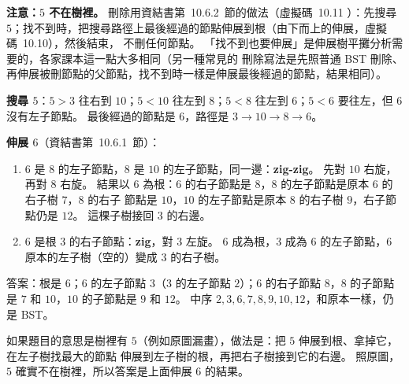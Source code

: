 \begin{pastsoln}
\textbf{注意：$5$ 不在樹裡。} 刪除用資結書第~10.6.2~節的做法（虛擬碼~10.11 ）：先搜尋
$5$；找不到時，把搜尋路徑上最後經過的節點伸展到根（由下而上的伸展，虛擬碼~10.10），然後結束，
不刪任何節點。 「找不到也要伸展」是伸展樹平攤分析需要的，各家課本這一點大多相同（另一種常見的
刪除寫法是先照普通 BST 刪除、再伸展被刪節點的父節點，找不到時一樣是伸展最後經過的節點，結果相同）。

\textbf{搜尋 $5$}：$5 > 3$ 往右到 $10$；$5 < 10$ 往左到 $8$；$5 < 8$ 往左到 $6$；$5 < 6$ 要往左，但
$6$ 沒有左子節點。 最後經過的節點是 $6$，路徑是 $3 \to 10 \to 8 \to 6$。

\textbf{伸展 $6$}（資結書第~10.6.1~節）：
\begin{enumerate}
\item $6$ 是 $8$ 的左子節點，$8$ 是 $10$ 的左子節點，同一邊：\textbf{zig-zig}。 先對 $10$ 右旋，再對
$8$ 右旋。 結果以 $6$ 為根：$6$ 的右子節點是 $8$，$8$ 的左子節點是原本 $6$ 的右子樹 $7$，$8$ 的右子
節點是 $10$，$10$ 的左子節點是原本 $8$ 的右子樹 $9$，右子節點仍是 $12$。 這棵子樹接回 $3$ 的右邊。
\item $6$ 是根 $3$ 的右子節點：\textbf{zig}，對 $3$ 左旋。 $6$ 成為根，$3$ 成為 $6$ 的左子節點，$6$
原本的左子樹（空的）變成 $3$ 的右子樹。
\end{enumerate}

\begin{center}
\end{center}

答案：根是 $6$；$6$ 的左子節點 $3$（$3$ 的左子節點 $2$）；$6$ 的右子節點 $8$，$8$ 的子節點是 $7$ 和
$10$，$10$ 的子節點是 $9$ 和 $12$。 中序 $2, 3, 6, 7, 8, 9, 10, 12$，和原本一樣，仍是 BST。

如果題目的意思是樹裡有 $5$（例如原圖漏畫），做法是：把 $5$ 伸展到根、拿掉它，在左子樹找最大的節點
伸展到左子樹的根，再把右子樹接到它的右邊。 照原圖，$5$ 確實不在樹裡，所以答案是上面伸展 $6$ 的結果。
\end{pastsoln}
